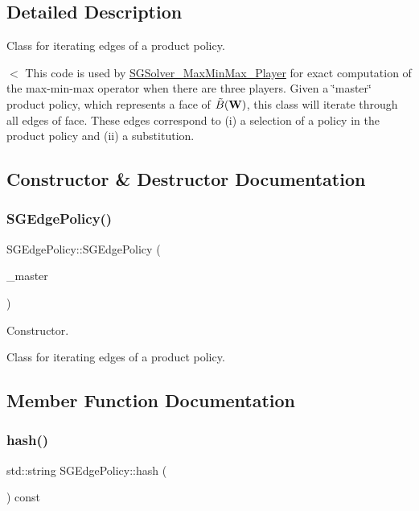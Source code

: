 \subsection{Detailed Description}
Class for iterating edges of a product policy. 

$<$ This code is used by \hyperlink{classSGSolver__MaxMinMax__3Player}{S\+G\+Solver\+\_\+\+Max\+Min\+Max\+\_\+Player} for exact computation of the max-\/min-\/max operator when there are three players. Given a \char`\"{}master\char`\"{} product policy, which represents a face of $\tilde{B}({\bf W})$, this class will iterate through all edges of face. These edges correspond to (i) a selection of a policy in the product policy and (ii) a substitution. 

\subsection{Constructor \& Destructor Documentation}
\mbox{\label{classSGEdgePolicy_a72828530fdfd5e6d849dadd07ac44724}} 
\subsubsection{\texorpdfstring{S\+G\+Edge\+Policy()}{SGEdgePolicy()}}
{\footnotesize\ttfamily S\+G\+Edge\+Policy\+::\+S\+G\+Edge\+Policy (\begin{DoxyParamCaption}\item[{const \hyperlink{classSGProductPolicy}{S\+G\+Product\+Policy} \&}]{\+\_\+master }\end{DoxyParamCaption})}



Constructor. 

Class for iterating edges of a product policy. 

\subsection{Member Function Documentation}
\mbox{\label{classSGEdgePolicy_ae106e1a7ebf78b0896316e16ca9c6063}} 
\subsubsection{\texorpdfstring{hash()}{hash()}}
{\footnotesize\ttfamily std\+::string S\+G\+Edge\+Policy\+::hash (\begin{DoxyParamCaption}{ }\end{DoxyParamCaption}) const}



